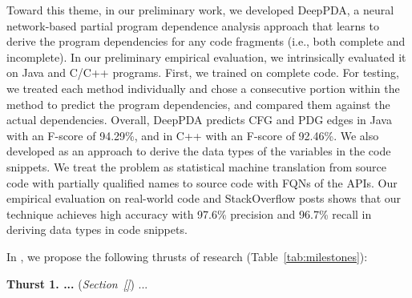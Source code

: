 Toward this theme, in our preliminary work, we developed DeepPDA, a neural
network-based partial program dependence analysis approach that learns
to derive the program dependencies for any code fragments (i.e., both
complete and incomplete). In our preliminary empirical evaluation, we
intrinsically evaluated it on Java and C/C++ programs. First, we
trained {\tool} on complete code. For testing, we treated each method
individually and chose a consecutive portion within the method to
predict the program dependencies, and compared them against the actual
dependencies. Overall, DeepPDA predicts CFG and PDG edges in Java
with an F-score of 94.29\%, and in C++ with an F-score of
92.46\%.
%
We also developed as an approach to derive the data
types of the variables in the code snippets. We treat the problem as
statistical machine translation from source code with partially
qualified names to source code with FQNs of the APIs. Our empirical
evaluation on real-world code and StackOverflow posts shows that our
technique achieves high accuracy with 97.6\% precision and 96.7\%
recall in deriving data types in code snippets.







In {\tool}, we propose the following thrusts of research
(Table~\ref{tab:milestones}):

\vspace{3pt}
\noindent \textbf{Thurst 1. ...} ({\em Section~\ref{}}) ...





